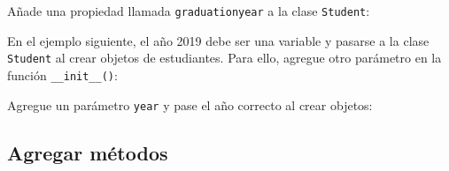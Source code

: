 \begin{code}
Añade una propiedad llamada \texttt{graduationyear} a la clase \texttt{Student}:

\begin{Shaded}
\begin{Highlighting}[]
   \NormalTok{(}
    \OperatorTok{=} 

\end{Highlighting}
\end{Shaded}
\end{code}

En el ejemplo siguiente, el año 2019 debe ser una variable y pasarse a
la clase \texttt{Student} al crear objetos de estudiantes. Para ello,
agregue otro parámetro en la función \texttt{\_\_init\_\_()}:\\

\begin{code}
Agregue un parámetro \texttt{year} y pase el año correcto al crear objetos:

\begin{Shaded}
\begin{Highlighting}[]
   \NormalTok{(}
    \OperatorTok{=}

\OperatorTok{=}\NormalTok{, }\NormalTok{, }\NormalTok{)}
\end{Highlighting}
\end{Shaded}
\end{code}

\subsection{Agregar métodos}

